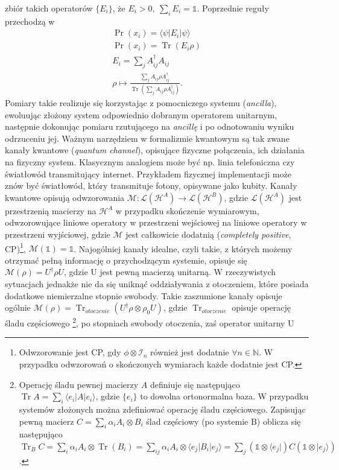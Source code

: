 \documentclass[10pt]{article} %
\DeclareMathOperator{\Trs}{Tr}
\newcommand{\Hx}[1]{\mathcal{H}^{#1}}
\newcommand{\Tr}[1]{\Trs(#1)}
\newcommand{\Pro}[1]{\Pr(#1)}
\newcommand{\Ket}[1]{|#1\rangle}
\newcommand{\Bra}[1]{\langle#1|}
\newcommand{\I}{\mathbb{1}}
\begin{document}
zbiór takich operatorów $\{E_i\}$, że $E_i > 0,~\sum_i E_i = \mathbb{1}$. Poprzednie reguły przechodzą w
\begin{gather}
\Pro{x_i} = \Bra{\psi} E_i \Ket{\psi}\\
\Pro{x_i} = \Tr{E_i \rho} \\
E_i = \sum_j  A^\dag_{ij}A_{ij} \\ 
\rho \mapsto \frac{\sum_j A_{ij} \rho A^\dag_{ij}}{\Tr{\sum_j A_{ij} \rho A^\dag_{ij}}}.
\end{gather} Pomiary takie realizuje się korzystając z pomocniczego systemu (\textit{ancilla}), ewoluując złożony system odpowiednio dobranym operatorem unitarnym, następnie dokonując pomiaru rzutującego na \textit{ancillę} i po odnotowaniu wyniku odrzuceniu jej.
Ważnym narzędziem w formalizmie kwantowym są tak zwane kanały kwantowe (\textit{quantum channel}), opisujące fizyczne połączenia, ich działania na fizyczny system. Klasycznym analogiem może być np. linia telefoniczna czy światłowód transmitujący internet. 
Przykładem fizycznej implementacji może znów być światłowód, który transmituje fotony, opisywane jako kubity. 
Kanały kwantowe opisują odwzorowania $\mathcal{M}: \mathcal{L}(\Hx{A}) \to \mathcal{L}({\Hx{B}})$, gdzie $\mathcal{L}({\Hx{A}})$ jest przestrzenią macierzy na $\Hx{A}$ w przypadku skończenie wymiarowym, odwzorowujące liniowe operatory w przestrzeni wejściowej na liniowe operatory w przestrzeni wyjściowej, gdzie $\mathcal{M}$ jest całkowicie dodatnią (\textit{completely positive}, CP)\footnote
{
Odwzorowanie jest CP, gdy $\phi \otimes \mathcal{I}_n$ również jest dodatnie $\forall n \in \mathds{N}$. W przypadku odwzorowań o skończonych wymiarach każde dodatnie jest CP.
}, $\mathcal{M}(\mathbb{1}) = \mathbb{1}$. Najogólniej kanały idealne, czyli takie, z których możemy otrzymać pełną informację o przychodzącym systemie, opisuje się $\mathcal{M}(\rho) = U^\dag \rho U$, gdzie U jest pewną macierzą unitarną. W rzeczywistych sytuacjach jednakże nie da się uniknąć
oddziaływania z otoczeniem, które posiada dodatkowe niemierzalne stopnie swobody. Takie zaszumione kanały opisuje ogólnie $\mathcal{M}(\rho) = \Trs_{otoczenie}(U^\dag \rho \otimes \rho_0 U)$, gdzie $\Trs_{otoczenie}$ opisuje operację śladu częściowego
\footnote{
Operację śladu pewnej macierzy $A$ definiuje się następująco $\Trs A = \sum_i \Bra{e_i} A \Ket{e_i}$, gdzie $\{e_i\}$ to dowolna ortonormalna baza.
W przypadku systemów złożonych można zdefiniować operację śladu częściowego. Zapisując pewną macierz $C = \sum_i \alpha_i A_i \otimes B_i$ ślad częściowy (po systemie B) oblicza się następująco $\Trs_B C = \sum_i \alpha_i A_i \otimes \Trs(B_i) = \sum_{ij} \alpha_i A_i \otimes \Bra{e_j}B_i\Ket{e_j} = \sum_j (\I \otimes \Bra{e_j}) C (\I \otimes \Ket{e_j})$.
}, po stopniach swobody otoczenia, zaś operator unitarny U
\end{document}
